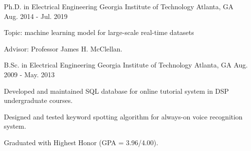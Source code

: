 

\begin{cventries}

	\cventry
		{Ph.D. in Electrical Engineering} %
		{Georgia Institute of Technology} %
		{Atlanta, GA} %
		{Aug. 2014 - Jul. 2019} %
		{
			\begin{cvitems} %
				\item {Topic: machine learning model for large-scale real-time datasets}
				\item {Advisor: Professor James H. McClellan.}
			\end{cvitems}
		}
		
	\cventry
		{B.Sc. in Electrical Engineering} %
		{Georgia Institute of Technology} %
		{Atlanta, GA} %
		{Aug. 2009 - May. 2013} %
		{
			\begin{cvitems} %
				\item {Developed and maintained SQL database for online tutorial system in DSP undergraduate courses.}
				\item {Designed and tested keyword spotting algorithm for always-on voice recognition system.}
				\item {Graduated with Highest Honor (GPA = 3.96/4.00).}
			\end{cvitems}
		}

\end{cventries}
